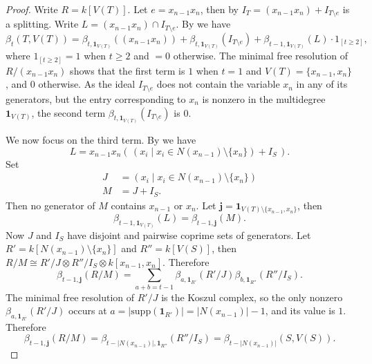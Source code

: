 \documentclass[dvipsnames,10pt]{article}
\begin{document}
\begin{proof}
    Write $R=k[V(T)]$. Let $e=x_{n-1}x_n$, then by  $I_T=(x_{n-1}x_n)+I_{T\setminus e}$ is a splitting. Write $L=(x_{n-1}x_n)\cap I_{T\setminus e}$. By  we have
    \begin{equation*}
        \beta_t(T,V(T)) = \beta_{t,\mathbf{1}_{V(T)}}((x_{n-1}x_{n})) + \beta_{t,\mathbf{1}_{V(T)}}(I_{T\setminus e}) + \beta_{t-1,\mathbf{1}_{V(T)}}(L)\cdot 1_{[t\geqslant 2]},
    \end{equation*}
    where $1_{[t\geqslant 2]}=1$ when $t\geqslant 2$ and $=0$ otherwise. The minimal free resolution of $R/(x_{n-1}x_n)$ shows that the first term is $1$ when $t=1$ and $V(T)=\{x_{n-1},x_n\}$, and $0$ otherwise. As the ideal $I_{T\setminus e}$ does not contain the variable $x_n$ in any of its generators, but the entry corresponding to $x_n$ is nonzero in the multidegree $\mathbf{1}_{V(T)}$, the second term $\beta_{t,\mathbf{1}_{V(T)}}(I_{T\setminus e})$ is $0$.

    We now focus on the third term. By  we have
    \begin{equation*}
        L=x_{n-1}x_n(\,(x_i\mid x_i \in N(x_{n-1})\setminus\{x_n\}) + I_S\,).
    \end{equation*}
    Set
    \begin{align*}
        J&=(x_i\mid x_i \in N(x_{n-1})\setminus\{x_n\})\\
        M&=J + I_S.
    \end{align*}
    Then no generator of $M$ contains $x_{n-1}$ or $x_n$. Let $\mathbf{j}=\mathbf{1}_{V(T)\setminus \{x_{n-1},x_n\}}$, then
    \begin{equation*}
        \beta_{t-1,\mathbf{1}_{V(T)}}(L) = \beta_{t-1,\mathbf{j}}(M).
    \end{equation*}
    Now $J$ and $I_S$ have disjoint and pairwise coprime sets of generators. Let $R'=k[N(x_{n-1})\setminus \{x_n\}]$ and $R''=k[V(S)]$, then $R/M\cong R'/J \otimes R''/I_S \otimes k[x_{n-1},x_n]$. Therefore
    \begin{equation*}
        \beta_{t-1,\mathbf{j}}(R/M) = \sum_{a+b=t-1}\beta_{a,\mathbf{1}_{R'}}(R'/J)\beta_{b,\mathbf{1}_{R''}}(R''/I_S).
    \end{equation*}
    The minimal free resolution of $R'/J$ is the Koszul complex, so the only nonzero $\beta_{a,\mathbf{1}_{R'}}(R'/J)$ occurs at $a=|\mathrm{supp}(\mathbf{1}_{R'})|=|N(x_{n-1})|-1$, and its value is $1$. Therefore
    \begin{equation*}
        \beta_{t-1,\mathbf{j}}(R/M) = \beta_{t-|N(x_{n-1})|,\mathbf{1}_{R''}}(R''/I_S) = \beta_{t-|N(x_{n-1})|}(S,V(S)).
    \end{equation*}


\end{proof}
\end{document}
